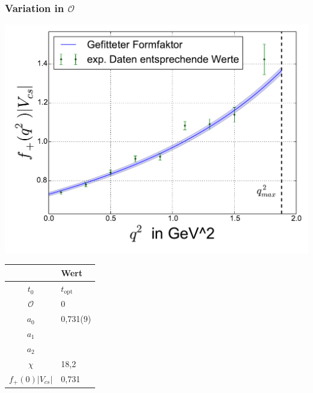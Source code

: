 \documentclass[hyperref={pdfpagelabels=false}]{beamer}
\begin{document}
\begin{frame}
 \frametitle{Variation in $\mathcal{O}$}
  \begin{minipage}[h]{0.66\textwidth}
  \includegraphics[width=1.0\textwidth]{../Fit/D+-0O-topt.pdf}
 \end{minipage}
 \begin{minipage}[h]{0.32\textwidth}
  \begin{table}[h]
   \begin{tabular}{c|l}
   \toprule
     & Wert\\
    \midrule
    $t_0$ & $t_\text{opt}$\\
    $\mathcal{O}$ & 0\\
    \midrule
    $a_0$ & 0,731(9)\\
    $a_1$ & \\
    $a_2$ & \\
    \midrule
    $\chi$ & 18,2\\
    $f_+(0)|V_{cs}|$ & 0,731\\
    \bottomrule\bottomrule
   \end{tabular}

  \end{table}

 \end{minipage}
\end{frame}
\end{document}

